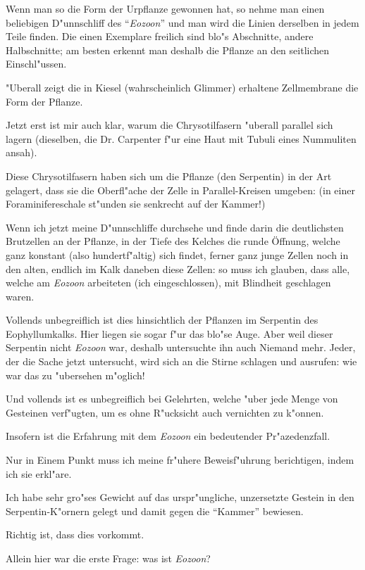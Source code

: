 \documentclass[a4paper, 11pt, oneside, german]{article}
\begin{document}
Wenn man so die Form der Urpflanze gewonnen hat, so nehme man einen beliebigen D"unnschliff des "`\emph{Eozoon}"' und man wird die Linien derselben in jedem Teile finden. Die einen Exemplare freilich sind blo"s Abschnitte, andere Halbschnitte; am besten erkennt man deshalb die Pflanze an den seitlichen Einschl"ussen.

"Uberall zeigt die in Kiesel (wahrscheinlich Glimmer) erhaltene Zellmembrane die Form der Pflanze.

Jetzt erst ist mir auch klar, warum die Chrysotilfasern "uberall parallel sich lagern (dieselben, die Dr. Carpenter f"ur eine Haut mit Tubuli eines Nummuliten ansah).

Diese Chrysotilfasern haben sich um die Pflanze (den Serpentin) in der Art gelagert, dass sie die Oberfl"ache der Zelle in Parallel-Kreisen umgeben: (in einer Foraminifereschale st"unden sie senkrecht auf der Kammer!)

Wenn ich jetzt meine D"unnschliffe durchsehe und finde darin die deutlichsten Brutzellen an der Pflanze, in der Tiefe des Kelches die runde Öffnung, welche ganz konstant (also hundertf"altig) sich findet, ferner ganz junge Zellen noch in den alten, endlich im Kalk daneben diese Zellen: so muss ich glauben, dass alle, welche am \emph{Eozoon} arbeiteten (ich eingeschlossen), mit Blindheit geschlagen waren.

Vollends unbegreiflich ist dies hinsichtlich der Pflanzen im Serpentin des Eophyllumkalks. Hier liegen sie sogar f"ur das blo"se Auge. Aber weil dieser Serpentin nicht \emph{Eozoon} war, deshalb untersuchte ihn auch Niemand mehr. Jeder, der die Sache jetzt untersucht, wird sich an die Stirne schlagen und ausrufen: wie war das zu "ubersehen m"oglich!

Und vollends ist es unbegreiflich bei Gelehrten, welche "uber jede Menge von Gesteinen verf"ugten, um es ohne R"ucksicht auch vernichten zu k"onnen.

Insofern ist die Erfahrung mit dem \emph{Eozoon} ein bedeutender Pr"azedenzfall.

Nur in Einem Punkt muss ich meine fr"uhere Beweisf"uhrung berichtigen, indem ich sie erkl"are.

Ich habe sehr gro"ses Gewicht auf das urspr"ungliche, unzersetzte Gestein in den Serpentin-K"ornern gelegt und damit gegen die "`Kammer"' bewiesen.

Richtig ist, dass dies vorkommt.

Allein hier war die erste Frage: was ist \emph{Eozoon}?
\end{document}
